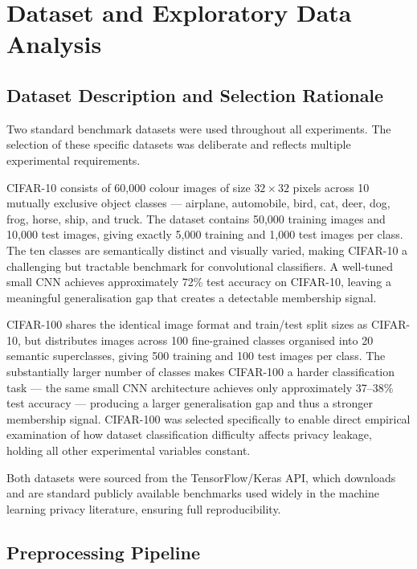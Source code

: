 \documentclass[12pt, a4paper]{report}
\begin{document}
\chapter{Dataset and Exploratory Data Analysis}

\section{Dataset Description and Selection Rationale}

Two standard benchmark datasets were used throughout all experiments. The
selection of these specific datasets was deliberate and reflects multiple
experimental requirements.

CIFAR-10 consists of 60,000 colour images of size $32 \times 32$ pixels across
10 mutually exclusive object classes --- airplane, automobile, bird, cat, deer,
dog, frog, horse, ship, and truck. The dataset contains 50,000 training images
and 10,000 test images, giving exactly 5,000 training and 1,000 test images per
class. The ten classes are semantically distinct and visually varied, making
CIFAR-10 a challenging but tractable benchmark for convolutional classifiers.
A well-tuned small CNN achieves approximately 72\% test accuracy on CIFAR-10,
leaving a meaningful generalisation gap that creates a detectable membership
signal.

CIFAR-100 shares the identical image format and train/test split sizes as
CIFAR-10, but distributes images across 100 fine-grained classes organised into
20 semantic superclasses, giving 500 training and 100 test images per class.
The substantially larger number of classes makes CIFAR-100 a harder classification
task --- the same small CNN architecture achieves only approximately 37--38\% test
accuracy --- producing a larger generalisation gap and thus a stronger membership
signal. CIFAR-100 was selected specifically to enable direct empirical examination
of how dataset classification difficulty affects privacy leakage, holding all
other experimental variables constant.

Both datasets were sourced from the TensorFlow/Keras API, which downloads and
are standard publicly available benchmarks used widely in the machine learning
privacy literature, ensuring full reproducibility.

\section{Preprocessing Pipeline}
\end{document}
